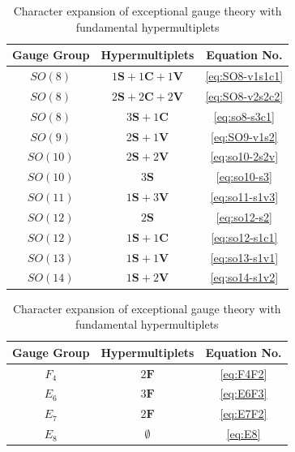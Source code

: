 \documentclass[letterpaper, 11pt]{article}
\begin{document}
{\begin{table}[p]
  \begin{tabular}{cc|c}
    \hline
    Gauge Group & Hypermultiplets & Equation No.\\
    \hline\hline
	$SO(8)$ & $1\boldsymbol{S}+1\boldsymbol{C}+1\boldsymbol{V}$ & \eqref{eq:SO8-v1s1c1}\\
	$SO(8)$ & $2\boldsymbol{S}+2\boldsymbol{C}+2\boldsymbol{V}$ & \eqref{eq:SO8-v2s2c2}\\
	$SO(8)$ & $3\boldsymbol{S}+1\boldsymbol{C}$ &  \eqref{eq:so8-s3c1}\\
	$SO(9)$ & $2\boldsymbol{S}+1\boldsymbol{V}$ & \eqref{eq:SO9-v1s2}\\
	$SO(10)$ & $2\boldsymbol{S}+2\boldsymbol{V}$ & \eqref{eq:so10-2s2v}\\
	$SO(10)$ & $3\boldsymbol{S}$ & \eqref{eq:so10-s3}\\
	$SO(11)$ & $1\boldsymbol{S}+3\boldsymbol{V}$ & \eqref{eq:so11-s1v3}\\
	$SO(12)$ & $2\boldsymbol{S}$ & \eqref{eq:so12-s2}\\
	$SO(12)$ & $1\boldsymbol{S}+1\boldsymbol{C}$ & \eqref{eq:so12-s1c1}\\
	$SO(13)$ & $1\boldsymbol{S}+1\boldsymbol{V}$ & \eqref{eq:so13-s1v1}\\
	$SO(14)$ & $1\boldsymbol{S}+2\boldsymbol{V}$ & \eqref{eq:so14-s1v2}\\\hline
    \end{tabular}
  \caption{Character expansion of $SO(N)$ theory with spinor hypermultiplets}
  \label{tbl:son-data}
\vspace{1cm}

  \begin{tabular}{cc|c}
    \hline
    Gauge Group & Hypermultiplets & Equation No.\\
    \hline\hline
	$F_4$ & $2\boldsymbol{F}$ & \eqref{eq:F4F2}\\
	$E_6$ & $3\boldsymbol{F}$ & \eqref{eq:E6F3}\\
	$E_7$ & $2\boldsymbol{F}$ & \eqref{eq:E7F2}\\
	$E_8$ & $\emptyset$ &  \eqref{eq:E8}\\\hline
    \end{tabular}
  \caption{Character expansion of exceptional gauge theory with fundamental hypermultiplets}
  \label{tbl:exc-data}
\vspace{1cm}

\end{table}

}
\end{document}
